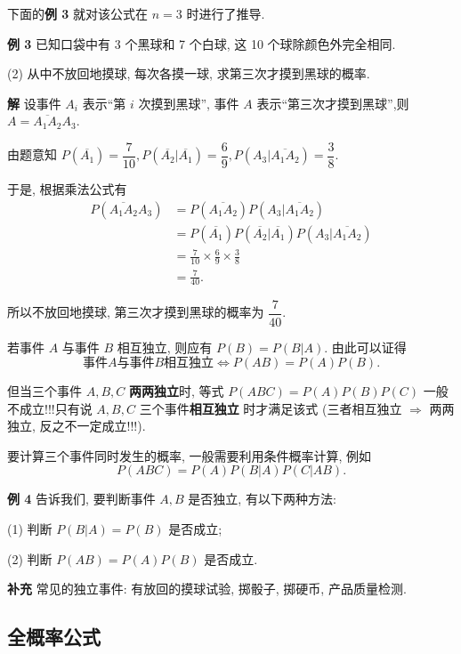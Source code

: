 \documentclass[titlepage]{ctexart}
\begin{document}
下面的\textbf{例 3} 就对该公式在 $n = 3$ 时进行了推导.

\vspace{1cm}

\textbf{例 3} \quad 已知口袋中有 3 个黑球和 7 个白球, 这 10 个球除颜色外完全相同.

(2) 从中不放回地摸球, 每次各摸一球, 求第三次才摸到黑球的概率. 

\textbf{解} \quad 设事件 $A_{i}$ 表示``第 $i$ 次摸到黑球'', 事件 $A$ 表示``第三次才摸到黑球'',则 $A = \overline{A_{1}A_{2}}A_{3}$.

由题意知 $P(\overline{A_{1}}) = \dfrac{7}{10}, P(\overline{A_{2}}|\overline{A_{1}}) = \dfrac{6}{9}, P(A_{3}|\overline{A_{1}A_{2}}) = \dfrac{3}{8}$.

于是, 根据乘法公式有
\begin{align*}
    P(\overline{A_{1}A_{2}}A_{3}) &= P(\overline{A_{1}A_{2}})P(A_{3}|\overline{A_{1}A_{2}}) \\
                                  &= P(\overline{A_{1}})P(\overline{A_{2}}|\overline{A_{1}})P(A_{3}|\overline{A_{1}A_{2}}) \\
                                  &= \frac{7}{10} \times \frac{6}{9} \times \frac{3}{8} \\
                                  &= \frac{7}{40}.
\end{align*}

所以不放回地摸球, 第三次才摸到黑球的概率为 $\dfrac{7}{40}$.

\vspace{1cm}

若事件 $A$ 与事件 $B$ 相互独立, 则应有 $P(B) = P(B|A)$. 由此可以证得
\[
\text{事件} A \text{与事件} B \text{相互独立} \Longleftrightarrow P(AB) = P(A)P(B).
\]

但当三个事件 $A,B,C$ \textbf{两两独立}时, 等式 $P(ABC) = P(A)P(B)P(C)$ 一般不成立!!!只有说 $A,B,C$ 三个事件\textbf{相互独立} 时才满足该式
(三者相互独立 $\Rightarrow$ 两两独立, 反之不一定成立!!!).

要计算三个事件同时发生的概率, 一般需要利用条件概率计算, 例如
\[
P(ABC) = P(A)P(B|A)P(C|AB).
\]

\textbf{例 4} 告诉我们, 要判断事件 $A, B$ 是否独立, 有以下两种方法:

(1) 判断 $P(B|A) = P(B)$ 是否成立;

(2) 判断 $P(AB) = P(A)P(B)$ 是否成立.

\textbf{补充} \quad
常见的独立事件: 有放回的摸球试验, 掷骰子, 掷硬币, 产品质量检测.

\subsection{全概率公式}
\end{document}
